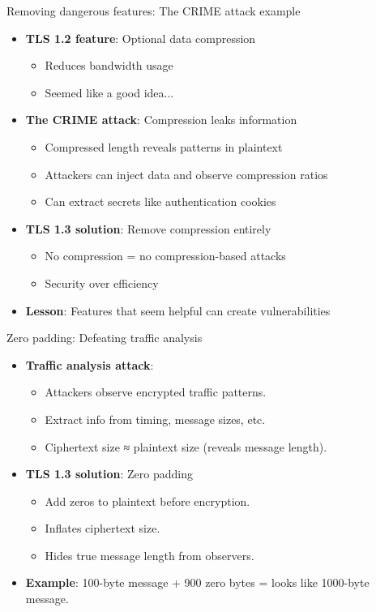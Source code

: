 \documentclass[aspectratio=169, lualatex, handout]{beamer}
\begin{document}
\begin{frame}{Removing dangerous features: The CRIME attack example}
	\begin{itemize}
		\item \textbf{TLS 1.2 feature}: Optional data compression
		      \begin{itemize}
			      \item Reduces bandwidth usage
			      \item Seemed like a good idea...
		      \end{itemize}
		\item \textbf{The CRIME attack}: Compression leaks information
		      \begin{itemize}
			      \item Compressed length reveals patterns in plaintext
			      \item Attackers can inject data and observe compression ratios
			      \item Can extract secrets like authentication cookies
		      \end{itemize}
		\item \textbf{TLS 1.3 solution}: Remove compression entirely
		      \begin{itemize}
			      \item No compression = no compression-based attacks
			      \item Security over efficiency
		      \end{itemize}
		\item \textbf{Lesson}: Features that seem helpful can create vulnerabilities
	\end{itemize}
\end{frame}

\begin{frame}{Zero padding: Defeating traffic analysis}
	\begin{itemize}
		\item \textbf{Traffic analysis attack}:
		      \begin{itemize}
			      \item Attackers observe encrypted traffic patterns.
			      \item Extract info from timing, message sizes, etc.
			      \item Ciphertext size ≈ plaintext size (reveals message length).
		      \end{itemize}
		\item \textbf{TLS 1.3 solution}: Zero padding
		      \begin{itemize}
			      \item Add zeros to plaintext before encryption.
			      \item Inflates ciphertext size.
			      \item Hides true message length from observers.
		      \end{itemize}
		\item \textbf{Example}: 100-byte message + 900 zero bytes = looks like 1000-byte message.
	\end{itemize}
\end{frame}
\end{document}
